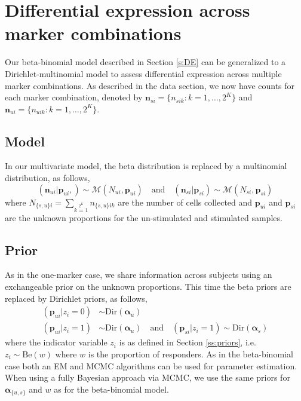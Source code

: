 \documentclass[useAMS,referee,usenatbib]{biom}
\begin{document}
\section{Differential expression across marker combinations}
\label{s:demarkercombos}
Our beta-binomial model described in Section \ref{s:DE} can be generalized to a Dirichlet-multinomial model to assess differential expression across multiple marker combinations. As described in the data section, we now have counts for each marker combination, denoted by  $\mathbf{n}_{si}=\{n_{sik}: k=1,\dots,2^K\}$ and $\mathbf{n}_{ui}=\{n_{uik}: k=1,\dots,2^K\}$.
\subsection{Model}

In our multivariate model, the beta distribution is replaced by a multinomial distribution, as follows,
\begin{equation*}
 (\mathbf{n}_{ui}|\mathbf{p}_{ui},) \sim \mathcal{M}(N_{ui},\mathbf{p}_{ui})\quad\text{and}\quad (\mathbf{n}_{si}|\mathbf{p}_{si}) \sim \mathcal{M}(N_{si},\mathbf{p}_{si})\label{eq:mult_likeliehood}
 \end{equation*}
where $N_{\{s,u\}i}=\sum\limits_{k=1}\limits^{2^K} n_{\{s,u\}ik}$ are the number of cells collected and $\mathbf{p}_{ui}$ and $\mathbf{p}_{si}$ are the unknown proportions for the un-stimulated and stimulated samples.

\subsection{Prior}
As in the one-marker case, we share information across subjects using an exchangeable prior on the unknown proportions. This time the beta priors are replaced by Dirichlet priors, as follows,
\begin{align*}
(\mathbf{p}_{ui}|z_i=0) &\sim \mathrm{Dir}(\boldsymbol{\alpha}_u)\\\nonumber
(\mathbf{p}_{ui}|z_i=1) &\sim \mathrm{Dir}(\boldsymbol{\alpha}_u) \quad \text{and}\quad (\mathbf{p}_{si}|z_i=1) \sim \mathrm{Dir}(\boldsymbol{\alpha}_s)%
\end{align*}
where the indicator variable $z_i$ is as defined in Section \ref{ss:priors}, i.e. $z_i\sim\mathrm{Be}(w)$ where $w$ is the proportion of responders. As in the beta-binomial case both an EM and MCMC algorithms can be used for parameter estimation. When using a fully Bayesian approach via MCMC, we use the same priors for $\boldsymbol{\alpha}_{\{u,s\}}$ and $w$ as for the beta-binomial model. 
\end{document}
